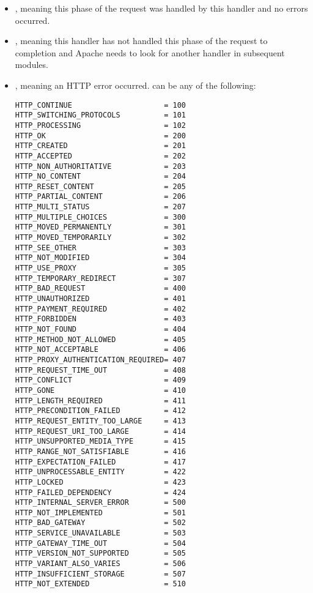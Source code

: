 \begin{itemize}

\item
{}, meaning this phase of the request was handled by this 
handler and no errors occurred. 

\item
{}, meaning this handler has not handled this
phase of the request to completion and Apache needs to look for
another handler in subsequent modules.
 
\item
{}, meaning an HTTP error occurred. 
 can be any of the following:

\begin{verbatim}
HTTP_CONTINUE                     = 100
HTTP_SWITCHING_PROTOCOLS          = 101
HTTP_PROCESSING                   = 102
HTTP_OK                           = 200
HTTP_CREATED                      = 201
HTTP_ACCEPTED                     = 202
HTTP_NON_AUTHORITATIVE            = 203
HTTP_NO_CONTENT                   = 204
HTTP_RESET_CONTENT                = 205
HTTP_PARTIAL_CONTENT              = 206
HTTP_MULTI_STATUS                 = 207
HTTP_MULTIPLE_CHOICES             = 300
HTTP_MOVED_PERMANENTLY            = 301
HTTP_MOVED_TEMPORARILY            = 302
HTTP_SEE_OTHER                    = 303
HTTP_NOT_MODIFIED                 = 304
HTTP_USE_PROXY                    = 305
HTTP_TEMPORARY_REDIRECT           = 307
HTTP_BAD_REQUEST                  = 400
HTTP_UNAUTHORIZED                 = 401
HTTP_PAYMENT_REQUIRED             = 402
HTTP_FORBIDDEN                    = 403
HTTP_NOT_FOUND                    = 404
HTTP_METHOD_NOT_ALLOWED           = 405
HTTP_NOT_ACCEPTABLE               = 406
HTTP_PROXY_AUTHENTICATION_REQUIRED= 407
HTTP_REQUEST_TIME_OUT             = 408
HTTP_CONFLICT                     = 409
HTTP_GONE                         = 410
HTTP_LENGTH_REQUIRED              = 411
HTTP_PRECONDITION_FAILED          = 412
HTTP_REQUEST_ENTITY_TOO_LARGE     = 413
HTTP_REQUEST_URI_TOO_LARGE        = 414
HTTP_UNSUPPORTED_MEDIA_TYPE       = 415
HTTP_RANGE_NOT_SATISFIABLE        = 416
HTTP_EXPECTATION_FAILED           = 417
HTTP_UNPROCESSABLE_ENTITY         = 422
HTTP_LOCKED                       = 423
HTTP_FAILED_DEPENDENCY            = 424
HTTP_INTERNAL_SERVER_ERROR        = 500
HTTP_NOT_IMPLEMENTED              = 501
HTTP_BAD_GATEWAY                  = 502
HTTP_SERVICE_UNAVAILABLE          = 503
HTTP_GATEWAY_TIME_OUT             = 504
HTTP_VERSION_NOT_SUPPORTED        = 505
HTTP_VARIANT_ALSO_VARIES          = 506
HTTP_INSUFFICIENT_STORAGE         = 507
HTTP_NOT_EXTENDED                 = 510
\end{verbatim}                      

\end{itemize}

